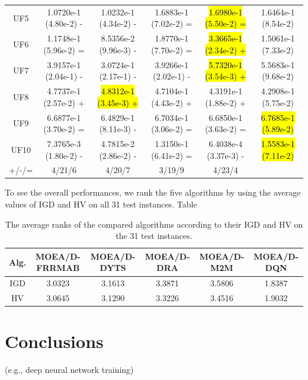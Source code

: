 \documentclass[journal]{IEEEtran}
\begin{document}
\begin{table}[]
\begin{tabular}{cccccc}
    UF5     & 1.0720e-1 (4.80e-2) -      & 1.0232e-1 (4.34e-2) -      & 1.6883e-1 (7.02e-2) =      & \hl{1.6980e-1 (5.50e-2) =} & 1.6464e-1 (8.54e-2)      \\
    UF6     & 1.1748e-1 (5.96e-2) =      & 8.5356e-2 (9.96e-3) -      & 1.8770e-1 (7.70e-2) =      & \hl{3.3665e-1 (2.34e-2) +} & 1.5061e-1 (7.33e-2)      \\
    UF7     & 3.9157e-1 (2.04e-1) -      & 3.0724e-1 (2.17e-1) -      & 3.9266e-1 (2.02e-1) -      & \hl{5.7320e-1 (3.54e-3) +} & 5.5683e-1 (9.68e-2)      \\
    UF8     & 4.7737e-1 (2.57e-2) +      & \hl{4.8312e-1 (3.45e-3) +} & 4.7104e-1 (4.43e-2) +      & 4.3191e-1 (1.88e-2) +      & 4.2908e-1 (5.75e-2)      \\
    UF9     & 6.6877e-1 (3.70e-2) =      & 6.4829e-1 (8.11e-3) -      & 6.7034e-1 (3.06e-2) =      & 6.6850e-1 (3.63e-2) =      & \hl{6.7685e-1 (5.89e-2)} \\
    UF10    & 7.3765e-3 (1.80e-2) -      & 4.7815e-2 (2.86e-2) -      & 1.3150e-1 (6.41e-2) =      & 6.4038e-4 (3.37e-3) -      & \hl{1.5583e-1 (7.11e-2)} \\
    \hline
    +/-/=   & 4/21/6                     & 4/20/7                     & 3/19/9                     & 4/23/4                     &                          \\
    \bottomrule
  \end{tabular}
  \label{tab:hv_all}
\end{table}

To see the overall performances, we rank the five algorithms by using the average values of IGD and HV on all 31 test instances. Table

\begin{table}[]
  \renewcommand{\arraystretch}{1.2}  %
  \centering
  \caption{The average ranks of the compared algorithms according to their IGD and HV on the 31 test instances.}
  \begin{tabular}{cccccc}
    \toprule
    Alg. & MOEA/D-FRRMAB & MOEA/D-DYTS & MOEA/D-DRA & MOEA/D-M2M & MOEA/D-DQN \\
    \midrule
    IGD  & 3.0323        & 3.1613      & 3.3871     & 3.5806     & 1.8387     \\
    HV   & 3.0645        & 3.1290      & 3.3226     & 3.4516     & 1.9032     \\
    \bottomrule
  \end{tabular}
  \label{tab:rank_all}
\end{table}



\section{Conclusions}


 (e.g., deep neural network training)

\ifCLASSOPTIONcaptionsoff
  \newpage
\fi



\end{document}
